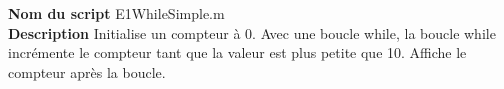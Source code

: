 \textbf{Nom du script}
E1WhileSimple.m\\
\textbf{Description}
Initialise un compteur à 0. Avec une boucle while, la boucle while incrémente le compteur tant que la valeur est plus petite que 10. Affiche le compteur après la boucle.